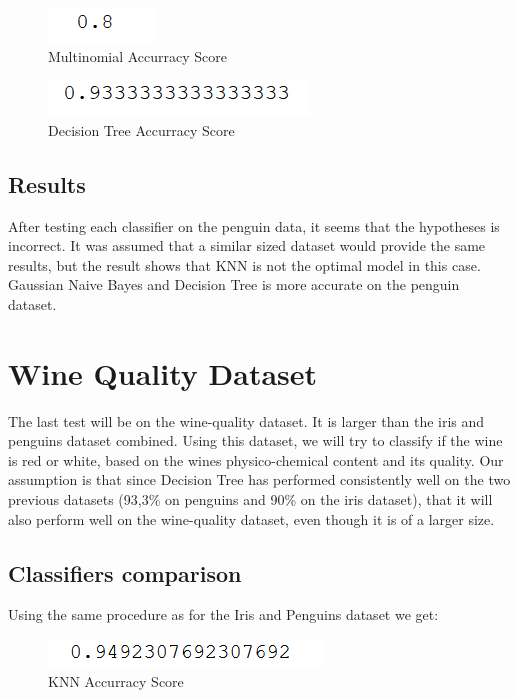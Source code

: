 \documentclass{article}
\begin{document}
\begin{figure}[!h]
  \caption{Multinomial Accurracy Score}
  \centering
    \includegraphics[scale=0.7]{multiPenguin.png}
\end{figure}

\begin{figure}[!h]
  \caption{Decision Tree Accurracy Score}
  \centering
    \includegraphics[scale=0.7]{treePenguin.png}
\end{figure}
\FloatBarrier

\subsection{Results}
After testing each classifier on the penguin data, it seems that the hypotheses is incorrect. It was assumed that a similar sized dataset would provide the same results, but the result shows that KNN is not the optimal model in this case. Gaussian Naive Bayes and Decision Tree is more accurate on the penguin dataset.
\section{Wine Quality Dataset}
The last test will be on the wine-quality dataset. It is larger than the iris and penguins dataset combined. Using this dataset, we will try to classify if the wine is red or white, based on the wines physico-chemical content and its quality. Our assumption is that since Decision Tree has performed consistently well on the two previous datasets  (93,3\% on penguins and 90\% on the iris dataset), that it will also perform well on the wine-quality dataset, even though it is of a larger size.
\subsection{Classifiers comparison}
Using the same procedure as for the Iris and Penguins dataset we get:

\begin{figure}[!h]
  \caption{KNN Accurracy Score}
  \centering
      \includegraphics[scale=0.7]{knnWine.png}
\end{figure}
\end{document}
